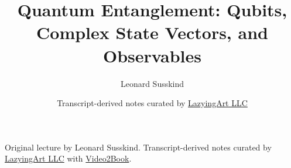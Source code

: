 \documentclass[11pt,oneside]{book}
\begin{document}
\frontmatter
\title{Quantum Entanglement: Qubits, Complex State Vectors, and Observables}
\author{Leonard Susskind}
\date{Transcript-derived notes curated by \href{https://lazying.art}{LazyingArt LLC}}
\maketitle
\begin{center}
\small Original lecture by Leonard Susskind. Transcript-derived notes curated by \href{https://lazying.art}{LazyingArt LLC} with \href{https://github.com/lachlanchen/Video2Book}{Video2Book}.
\end{center}
\clearpage
\mainmatter

\end{document}
